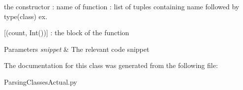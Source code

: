 the constructor  \+: name of function  \+: list of tuples containing name followed by type(class) ex. 

\mbox{[}(\textquotesingle{}count\textquotesingle{}, Int())\mbox{]}  \+: the block of the function 
\begin{DoxyParams}{Parameters}
{\em snippet} & The relevant code snippet \\
\hline
\end{DoxyParams}


The documentation for this class was generated from the following file\+:\begin{DoxyCompactItemize}
\item 
Parsing\+Classes\+Actual.\+py\end{DoxyCompactItemize}
